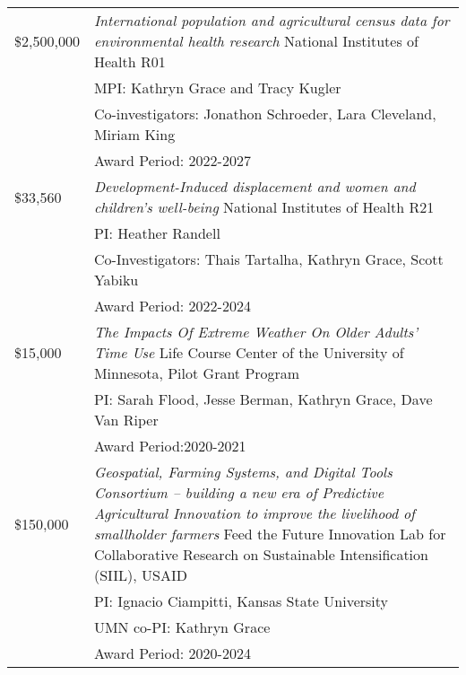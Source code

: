\documentclass[11pt]{article} %
\begin{document}
\begin{tabular}{lp{11cm}}

\$2,500,000 &\emph{International population and agricultural census data for environmental health research} National Institutes of Health R01\\
&MPI: Kathryn Grace and Tracy Kugler\\
&Co-investigators: Jonathon Schroeder, Lara Cleveland, Miriam King\\
&Award Period: 2022-2027\\

\$33,560 &\emph{Development-Induced displacement and women and children's well-being} National Institutes of Health R21\\
&PI: Heather Randell\\
&Co-Investigators: Thais Tartalha, Kathryn Grace, Scott Yabiku\\
&Award Period: 2022-2024\\

\$15,000 &\emph{The Impacts Of Extreme Weather On Older Adults’ Time Use} Life Course Center of the University of Minnesota, Pilot Grant Program\\
&PI: Sarah Flood, Jesse Berman, Kathryn Grace, Dave Van Riper\\
&Award Period:2020-2021\\

\$150,000 &\emph{Geospatial, Farming Systems, and Digital Tools Consortium – building a new era of Predictive Agricultural Innovation to improve the livelihood of smallholder farmers} Feed the Future Innovation Lab for Collaborative Research on Sustainable Intensification (SIIL), USAID\\
&PI: Ignacio Ciampitti, Kansas State University\\
&UMN co-PI: Kathryn Grace\\
& Award Period: 2020-2024\\

  \end{tabular}
\end{document}
